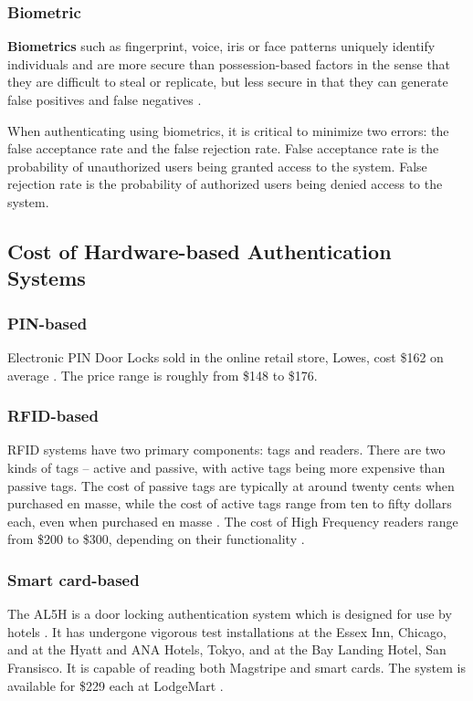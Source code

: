 \subsubsection{Biometric}
\textbf{Biometrics} such as fingerprint, voice, iris or face patterns uniquely identify individuals and are more secure than possession-based factors in the sense that they are difficult to steal or replicate, but less secure in that they can generate false positives and false negatives \cite{AAMHS2011}.

When authenticating using biometrics, it is critical to minimize two errors: the false acceptance rate and the false rejection rate. False acceptance rate is the probability of unauthorized users being granted access to the system. False rejection rate is the probability of authorized users being denied access to the system.


\subsection{Cost of Hardware-based Authentication Systems}
\subsubsection{PIN-based}
Electronic PIN Door Locks sold in the online retail store, Lowes, cost \$162 on average \cite{LowesKeypadLocks}. The price range is roughly from \$148 to \$176.

\subsubsection{RFID-based}
RFID systems have two primary components: tags and readers. There are two kinds of tags -- active and passive, with active tags being more expensive than passive tags. The cost of passive tags are typically at around twenty cents when purchased en masse, while the cost of active tags range from ten to fifty dollars each, even when purchased en masse \cite{Violino2005}. The cost of High Frequency readers range from \$200 to \$300, depending on their functionality \cite{Violino2006}.

\subsubsection{Smart card-based}
The AL5H is a door locking authentication system which is designed for use by hotels \cite{MiwaLock}.  It has undergone vigorous test installations at the Essex Inn, Chicago, and at the Hyatt and ANA Hotels, Tokyo, and at the Bay Landing Hotel, San Fransisco. It is capable of reading both Magstripe and smart cards. The system is available for \$229 each at LodgeMart \cite{LodgemartMiwaLock}.

